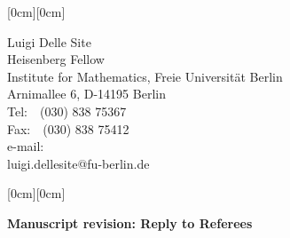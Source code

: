 \documentclass[12pt,a4paper]{article}
\newcommand{\kopf}{\noindent
\raisebox{2.5cm}[0cm][0cm]
{
\parbox[c]{0.88\textwidth}
{
\begin{center}
\textsc{Luigi Delle Site, Heisenberg Fellow}
\end{center}
}
}
\raisebox{2cm}[0cm][0cm]{\rule{\textwidth}{0.2mm}}}
\begin{document}

\hfill\raisebox{1.5cm}[0cm][0cm]
{\parbox[t]{0.34\textwidth}
{Luigi Delle Site\\
Heisenberg Fellow\\
Institute for Mathematics, Freie Universit\"{a}t Berlin\\
Arnimallee 6, D-14195 Berlin\\
Tel:\ \ (030) 838 75367\\
Fax:\ \ (030) 838 75412\\
{\small e-mail:\\luigi.dellesite@fu-berlin.de}
}}

\noindent\raisebox{1.05cm}[0cm][0cm]
{}

\vspace{3cm}

\textbf{Manuscript revision: Reply to Referees}
\end{document}

